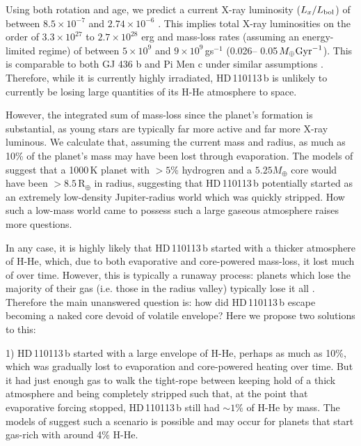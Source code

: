 \documentclass[fleqn,usenatbib]{mnras}
\newcommand{\rearth}{R$_{\oplus}$}
\newcommand{\Tplanet}{HD\,110113\,b}
\begin{document}
Using both rotation and age, we predict a current X-ray luminosity ($L_x/L_{\rm bol}$) of between $8.5\times10^{-7}$ \citep[with Prot;][]{wright2018stellar} and $2.74\times10^{-6}$ \citep[with age;][]{jackson2012coronal}.
This implies total X-ray luminosities on the order of $3.3\times10^{27}$ to $2.7\times10^{28}$ erg and mass-loss rates (assuming an energy-limited regime) of between $5\times10^{9}$ and $9\times10^{9}$\,gs$^{-1}$ (0.026-- 0.05\,$M_\oplus {\rm Gyr}^{-1}$).
This is comparable to both GJ 436 b and Pi Men c under similar assumptions \citep{king2019xuv}.
Therefore, while it is currently highly irradiated, \Tplanet{} is unlikely to currently be losing large quantities of its H-He atmosphere to space.

However, the integrated sum of mass-loss since the planet's formation is substantial, as young stars are typically far more active and far more X-ray luminous.
We calculate that, assuming the current mass and radius, as much as 10\% of the planet's mass may have been lost through evaporation.
The models of \citet{zeng2019growth} suggest that a 1000\,K planet with $>5$\% hydrogren and a $5.25M_\oplus$ core would have been $>8.5$\,\rearth{} in radius, suggesting that \Tplanet{} potentially started as an extremely low-density Jupiter-radius world which was quickly stripped.
How such a low-mass world came to possess such a large gaseous atmosphere raises more questions.

In any case, it is highly likely that \Tplanet{} started with a thicker atmosphere of H-He, which, due to both evaporative and core-powered mass-loss, it lost much of over time.
However, this is typically a runaway process: planets which lose the majority of their gas (i.e. those in the radius valley) typically lose it all \citep{owen2017evaporation}.
Therefore the main unanswered question is: how did \Tplanet{} escape becoming a naked core devoid of volatile envelope?
Here we propose two solutions to this:

1) \Tplanet{} started with a large envelope of H-He, perhaps as much as 10\%, which was gradually lost to evaporation and core-powered heating over time. 
But it had just enough gas to walk the tight-rope between keeping hold of a thick atmosphere and being completely stripped such that, at the point that evaporative forcing stopped, \Tplanet{} still had $\sim1\%$ of H-He by mass.
The models of \citet[][Figure 4]{rogers2020unveiling} suggest such a scenario is possible and may occur for planets that start gas-rich with around 4\% H-He.
\end{document}
